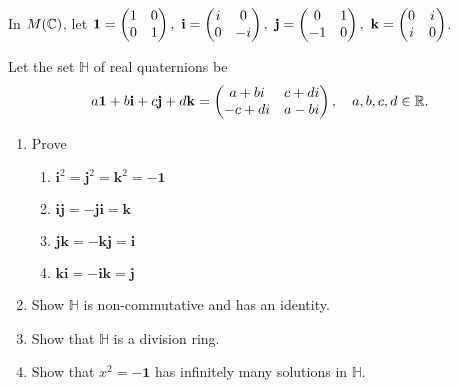 \documentclass[../hw3]{subfiles}
\begin{document}
\begin{problem}
In $M(\mathbb{C})$, let
$\bf{1}=\begin{pmatrix} 1 & 0 \\ 0 & 1 \end{pmatrix},\
	\mathbf{i}=\begin{pmatrix} i & 0 \\ 0 & -i \end{pmatrix},\
	\mathbf{j}=\begin{pmatrix} 0 & 1 \\ -1 & 0 \end{pmatrix},\
	\mathbf{k}=\begin{pmatrix} 0 & i \\ i & 0 \end{pmatrix}$.

Let the set $\mathbb{H}$ of real quaternions be \[
	a \mathbf{1}+b\mathbf{i}+c\mathbf{j}+d\mathbf{k} = \begin{pmatrix} a + bi & c + di \\ -c + di & a-bi \end{pmatrix},\quad a,b,c,d\in \mathbb{R}
	.\]
\begin{enumerate}[label=\alph*)]
	\item Prove
	      \begin{enumerate}[label=\roman*)]
		      \item $\mathbf{i}^2=\mathbf{j}^2=\mathbf{k}^2=-\mathbf{1}$
		      \item $\mathbf{i}\mathbf{j}=-\mathbf{j}\mathbf{i}=\mathbf{k}$
		      \item $\mathbf{j}\mathbf{k}=-\mathbf{k}\mathbf{j}=\mathbf{i}$
		      \item  $\mathbf{k}\mathbf{i}=-\mathbf{i}\mathbf{k}=\mathbf{j}$
	      \end{enumerate}
	\item  Show $\mathbb{H}$ is non-commutative and has an identity.
	\item  Show that $\mathbb{H}$ is a division ring.
	\item  Show that $x^2=-\mathbf{1}$ has infinitely many solutions in $\mathbb{H}$.
\end{enumerate}
\end{problem}
\end{document}
